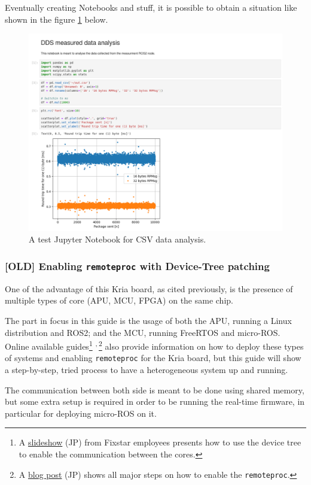 \documentclass[10pt]{article}
\begin{document}
Eventually creating Notebooks and stuff, it is possible to obtain a situation like shown in the figure \ref{fig:orga057605} below.

\begin{figure}[htbp]
\centering
\includegraphics[width=.6\textwidth]{img/jupyter.png}
\caption{\label{fig:orga057605}A test Jupyter Notebook for CSV data analysis.}
\end{figure}

\subsubsection{[OLD] Enabling \texttt{remoteproc} with Device-Tree patching}
\label{sec:org339afba}
One of the advantage of this Kria board, as cited previously, is the presence of
multiple types of core (APU, MCU, FPGA) on the same chip.

The part in focus in this guide is the usage of both the APU, running
a Linux distribution and ROS2; and the MCU, running FreeRTOS and micro-ROS.
Online available guides\footnote{A \href{https://speakerdeck.com/fixstars/fpga-seminar-12-fixstars-corporation-20220727}{slideshow} (JP) from Fixstar employees presents how to use the device
tree to enable the communication between the cores.} \textsuperscript{,}\,\footnote{A \href{https://zenn.dev/ryuz88/articles/kv260\_setup\_memo\_ubuntu22 }{blog post} (JP) shows all major steps on how to enable the \texttt{remoteproc}.} also provide information on how to deploy these types
of systems and enabling \texttt{remoteproc} for the Kria board, but this guide
will show a step-by-step, tried process to have a heterogeneous system
up and running.

The communication between both side is meant to be done using shared memory, but
some extra setup is required in order to be running the real-time firmware, in particular
for deploying micro-ROS on it.
\end{document}
